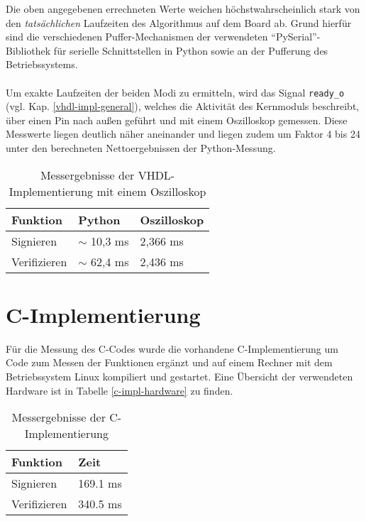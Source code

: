 Die oben angegebenen errechneten Werte weichen höchstwahrscheinlich stark von den \textit{tatsächlichen} Laufzeiten des Algorithmus auf dem Board ab. Grund hierfür sind die verschiedenen Puffer-Mechanismen der verwendeten ``PySerial''-Bibliothek für serielle Schnittstellen in Python sowie an der Pufferung des Betriebssystems. 
\\ \\
Um exakte Laufzeiten der beiden Modi zu ermitteln, wird das Signal \texttt{ready\_o} (vgl. Kap. \ref{vhdl-impl-general}), welches die Aktivität des Kernmoduls beschreibt, über einen Pin nach außen geführt und mit einem Oszilloskop gemessen. Diese Messwerte liegen deutlich näher aneinander und liegen zudem um Faktor 4 bis 24 unter den berechneten Nettoergebnissen der Python-Messung. \\

\begin{table}[h]
	\centering 
	\begin{tabular}{ | p{3cm} | p{3cm} | p{3cm} | }
		\hline
		\textbf{Funktion} & \textbf{Python} & \textbf{Oszilloskop} \\
		\hline
		Signieren & $\sim$ 10,3 ms & 2,366 ms\\
		\hline
		Verifizieren & $\sim$ 62,4 ms & 2,436 ms\\
		\hline
	\end{tabular}
	\caption{Messergebnisse der VHDL-Implementierung mit einem Oszilloskop}
	\label{vhdl-messung-2}
\end{table}

\section{C-Implementierung}
Für die Messung des C-Codes wurde die vorhandene C-Implementierung um Code zum Messen der Funktionen ergänzt und auf einem Rechner mit dem Betriebssystem Linux kompiliert und gestartet. Eine Übersicht der verwendeten Hardware ist in Tabelle \ref{c-impl-hardware} zu finden. \\

\begin{table}[h]
	\centering 
	\begin{tabular}{ | p{3cm} | p{6cm} | }
		\hline
		\textbf{Funktion} & \textbf{Zeit} \\
		\hline
		Signieren & 169.1 ms \\
		\hline
		Verifizieren & 340.5 ms \\
		\hline
	\end{tabular}
	\caption{Messergebnisse der C-Implementierung}
	\label{c-messung}
\end{table}

